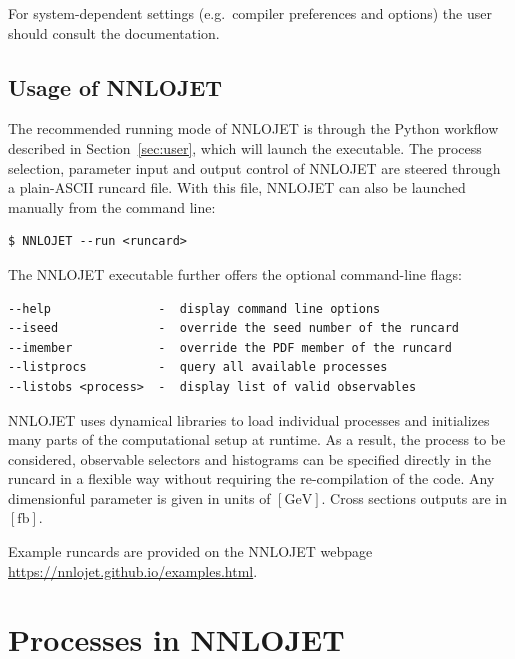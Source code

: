 \documentclass{SciPost}
\DeclareRobustCommand{\ensuremathrm}[1]{\ensuremath{\mathrm{#1}}}
\DeclareRobustCommand{\GeV}{\ensuremathrm{GeV}\xspace}
\DeclareRobustCommand{\fb}{\ensuremathrm{fb}\xspace}
\DeclareRobustCommand{\command}[1]{\makebox{\lstinline[language=commands]^#1^}}
\newcommand{\myurl}[1]{\href{#1}{#1}}
\begin{document}
For system-dependent settings (e.g.\ compiler preferences and options) the user should consult the \command{cmake} documentation.

\subsection{Usage of NNLOJET}
\label{sec:framework:usage}

The recommended running mode of NNLOJET is through the Python workflow described in Section~\ref{sec:user},
which will launch the \command{NNLOJET} executable. The process selection, parameter input and output control of NNLOJET are steered through a plain-ASCII runcard file.
%
With this file, NNLOJET can also be launched manually from the command line:
\begin{lstlisting}[language=commands]
$ NNLOJET --run <runcard>
\end{lstlisting}
The NNLOJET executable further offers the optional command-line flags:
\begin{lstlisting}
--help               -  display command line options
--iseed              -  override the seed number of the runcard
--imember            -  override the PDF member of the runcard
--listprocs          -  query all available processes
--listobs <process>  -  display list of valid observables
\end{lstlisting}
NNLOJET uses dynamical libraries to load individual processes
and initializes many parts of the computational setup at runtime.
As a result, the process to be considered, observable selectors and histograms can be specified directly in the runcard in a flexible way without requiring the re-compilation of the code. Any dimensionful parameter is given in units of $[\GeV]$. Cross sections outputs are in $[\fb]$.

Example runcards are provided on the NNLOJET webpage \myurl{https://nnlojet.github.io/examples.html}.


\section{Processes in NNLOJET}
\label{sec:procs}
\end{document}

